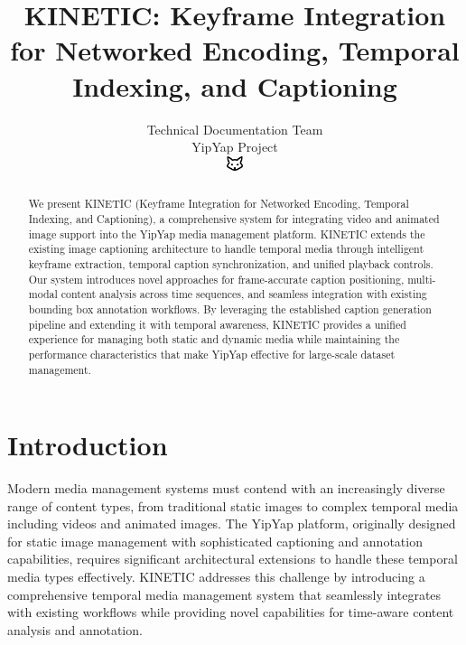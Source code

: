 \documentclass[10pt]{article}
\begin{document}
\title{KINETIC: Keyframe Integration for Networked Encoding, Temporal Indexing, and Captioning}

\author{Technical Documentation Team\\
YipYap Project\\
\includegraphics[width=0.5cm]{favicon.pdf}}

\maketitle

\begin{abstract}
We present KINETIC (Keyframe Integration for Networked Encoding, Temporal Indexing, and Captioning), a comprehensive system for integrating video and animated image support into the YipYap media management platform. KINETIC extends the existing image captioning architecture to handle temporal media through intelligent keyframe extraction, temporal caption synchronization, and unified playback controls. Our system introduces novel approaches for frame-accurate caption positioning, multi-modal content analysis across time sequences, and seamless integration with existing bounding box annotation workflows. By leveraging the established caption generation pipeline and extending it with temporal awareness, KINETIC provides a unified experience for managing both static and dynamic media while maintaining the performance characteristics that make YipYap effective for large-scale dataset management.
\end{abstract}

\section{Introduction}

Modern media management systems must contend with an increasingly diverse range of content types, from traditional static images to complex temporal media including videos and animated images. The YipYap platform, originally designed for static image management with sophisticated captioning and annotation capabilities, requires significant architectural extensions to handle these temporal media types effectively. KINETIC addresses this challenge by introducing a comprehensive temporal media management system that seamlessly integrates with existing workflows while providing novel capabilities for time-aware content analysis and annotation.
\end{document}
